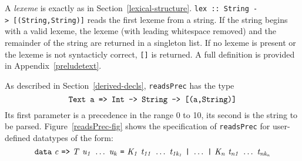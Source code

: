 A {\em lexeme} is exactly as in Section~\ref{lexical-structure}.
\mbox{\tt lex\ ::\ String\ ->\ [(String,String)]} reads the first lexeme from a
string.  If the string begins with a valid lexeme, the lexeme (with
leading whitespace removed) and the remainder of the string are
returned in a singleton list.  If no lexeme is present or the lexeme
is not syntacticly correct, \mbox{\tt []} is returned.  A full definition is
provided in Appendix~\ref{preludetext}.


As described in Section~\ref{derived-decls}, \mbox{\tt readsPrec} has the type
\[
\mbox{$\it \makebox{\tt Text\ a\ =>\ Int\ ->\ String\ ->\ [(a,String)]}$}
\]
Its first parameter is a
precedence in the range 0 to 10, its second is the string to be
parsed.  
Figure~\ref{readsPrec-fig} shows the specification of \mbox{\tt readsPrec} for user-defined 
datatypes of the form:
\[
\mbox{$\it \makebox{\tt data}\ c\ \makebox{\tt =>}\ T\ u_1\ \ldots \ u_k\ \makebox{\tt =}\ K_1\ t_{11}\ \ldots \ t_{1k_1}\ \makebox{\tt |}\ \ldots \ \makebox{\tt |}\ K_n\ t_{n1}\ \ldots \ t_{nk_n}$}
\]

